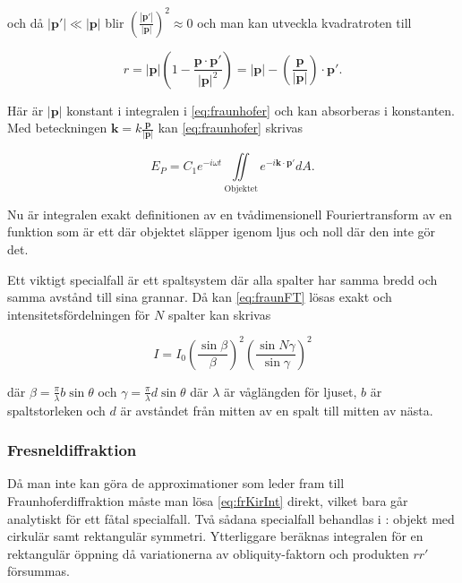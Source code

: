 \documentclass[a4paper]{article}
\begin{document}
och då $|\boldsymbol{p'}|\ll|\boldsymbol{p}|$ blir $\left(\frac{|\boldsymbol{p'}|}{|\boldsymbol{p}|}\right)^2\approx 0$ och man kan utveckla kvadratroten till

\begin{equation}
	r = |\boldsymbol{p}|\left( 1 - \frac{\boldsymbol{p}\cdot\boldsymbol{p'}}{|\boldsymbol{p}|^2} \right) = |\boldsymbol{p}| - \left(\frac{\boldsymbol{p}}{|\boldsymbol{p}|}\right)\cdot\boldsymbol{p'}\text{.}
\end{equation}

Här är $|\boldsymbol{p}|$ konstant i integralen i \eqref{eq:fraunhofer} och kan absorberas i konstanten. Med beteckningen $\boldsymbol{k} = k \frac{\boldsymbol{p}}{|\boldsymbol{p}|}$ kan \eqref{eq:fraunhofer} skrivas \cite{labManual}

\begin{equation}
	E_P = C_1 e^{-i \omega t} \iint\limits_{\mathrm{Objektet}} {e^{-i \boldsymbol{k}\cdot\boldsymbol{p'}} dA}\text{.}
	\label{eq:fraunFT}
\end{equation}

Nu är integralen exakt definitionen av en tvådimensionell Fouriertransform av en funktion som är ett där objektet släpper igenom ljus och noll där den inte gör det. \cite{labManual}

Ett viktigt specialfall är ett spaltsystem där alla spalter har samma bredd och samma avstånd till sina grannar. Då kan \eqref{eq:fraunFT} lösas exakt och intensitetsfördelningen för $N$ spalter kan skrivas \cite[p.~301]{pearsonIntroOpt} \cite{labManual}

\begin{equation}
	I = I_0 \left(\frac{\sin\beta}{\beta}\right)^2 \left(\frac{\sin N\gamma}{\sin\gamma}\right)^2
	\label{eq:diffGrating}
\end{equation}

där $\beta = \frac{\pi}{\lambda} b \sin\theta$ och $\gamma = \frac{\pi}{\lambda} d \sin\theta$ där $\lambda$ är våglängden för ljuset, $b$ är spaltstorleken och $d$ är avståndet från mitten av en spalt till mitten av nästa.

\subsubsection{Fresneldiffraktion}

Då man inte kan göra de approximationer som leder fram till Fraunhoferdiffraktion måste man lösa \eqref{eq:frKirInt} direkt, vilket bara går analytiskt för ett fåtal specialfall. Två sådana specialfall behandlas i \cite{pearsonIntroOpt}: objekt med cirkulär samt rektangulär symmetri. Ytterliggare beräknas integralen för en rektangulär öppning då variationerna av obliquity-faktorn och produkten $r r'$ försummas.
\end{document}
